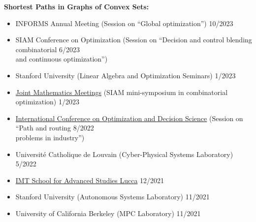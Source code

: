 \documentclass[11pt,a4paper,sans]{moderncv}
\begin{document}
\vspace{5pt}

\textbf{Shortest Paths in Graphs of Convex Sets:}

\vspace{5pt}

\begin{itemize}

\item
INFORMS Annual Meeting (Session on ``Global optimization'') \hfill 10/2023

\item
SIAM Conference on Optimization (Session on ``Decision and control blending combinatorial \hfill 6/2023 \\ and continuous optimization'')

\item
Stanford University (Linear Algebra and Optimization Seminars) \hfill 1/2023

\item \href{https://www.jointmathematicsmeetings.org/meetings/national/jmm2023/2270_program.html}{\color{cyan}Joint Mathematics Meetings} (SIAM mini-symposium in combinatorial optimization)  \hfill 1/2023


\item \href{http://www.airoconference.it/ods2022/}{\color{cyan}International Conference on Optimization and Decision Science} (Session on ``Path and routing \hfill 8/2022 \\ problems in industry'') 


\item Universit\'e Catholique de Louvain (Cyber-Physical Systems Laboratory) \hfill 5/2022

\item \href{https://www.imtlucca.it/en/eventonew/shortest-paths-graphs-of-convex-sets}{\color{cyan}IMT School for Advanced Studies Lucca} \hfill 12/2021

\item Stanford University (Autonomous Systems Laboratory) \hfill 11/2021

\item University of California Berkeley (MPC Laboratory) \hfill 11/2021


\end{itemize}
\end{document}
